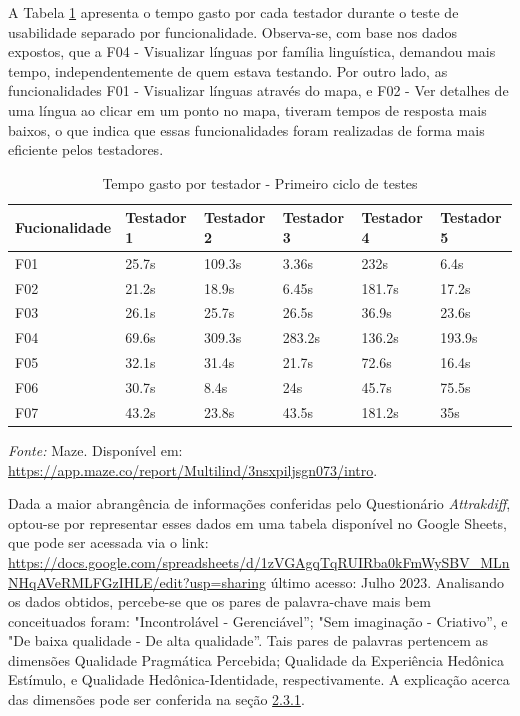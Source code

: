 A Tabela \ref{tab06} apresenta o tempo gasto por cada testador durante o teste de usabilidade separado por funcionalidade. Observa-se, com base nos dados expostos, que a F04 - Visualizar línguas por família linguística, 
demandou mais tempo, independentemente de quem estava testando. Por outro lado, as funcionalidades F01 - Visualizar línguas através do mapa, e F02 - Ver detalhes de uma língua ao clicar em um ponto no mapa, tiveram tempos 
de resposta mais baixos, o que indica que essas funcionalidades foram realizadas de forma mais eficiente pelos testadores.

\begin{table}[h!]
	\centering
	\caption{Tempo gasto por testador - Primeiro ciclo de testes}
	\label{tab06}
	\begin{adjustbox}{center}
	\begin{tabular}{l|l|l|l|l|l}
	\hline
	Fucionalidade & Testador 1 & Testador 2 & Testador 3 & Testador 4 & Testador 5 \\ 	\hline
	F01                   & 25.7s     & 109.3s     & 3.36s      & 232s       & 6.4s      \\
	F02                   & 21.2s        & 18.9s      & 6.45s      & 181.7s    & 17.2s     \\
	F03                   & 26.1s        & 25.7s      & 26.5s      & 36.9s     & 23.6s     \\
	F04                   & 69.6s        & 309.3s     & 283.2s     & 136.2s     & 193.9s     \\
	F05                   & 32.1s      & 31.4s      & 21.7s     & 72.6s     & 16.4s     \\
	F06                   & 30.7s     & 8.4s      & 24s     & 45.7s     & 75.5s     \\
	F07                   & 43.2s     & 23.8s      & 43.5s     & 181.2s    & 35s      \\ 	\hline
	\end{tabular}
	\end{adjustbox}
	\begin{tablenotes}[flushleft]
		\centering
		\item \textit{Fonte:} Maze. Disponível em: \url{https://app.maze.co/report/Multilind/3nsxpiljsgn073/intro}.
	  \end{tablenotes}
\end{table}


Dada a maior abrangência de informações conferidas pelo Questionário \textit{Attrakdiff}, optou-se por representar esses dados em uma tabela disponível no Google Sheets, que pode ser acessada via o link: 
\url{https://docs.google.com/spreadsheets/d/1zVGAgqTqRUIRba0kFmWySBV_MLnNHqAVeRMLFGzIHLE/edit?usp=sharing} último acesso: Julho 2023. Analisando os dados obtidos, percebe-se que os pares de palavra-chave 
mais bem conceituados foram: "Incontrolável - Gerenciável''; "Sem imaginação - Criativo'', e "De baixa qualidade - De alta qualidade''. Tais pares de palavras pertencem as dimensões Qualidade Pragmática Percebida;
Qualidade da Experiência Hedônica Estímulo, e Qualidade Hedônica-Identidade, respectivamente. A explicação acerca das dimensões pode ser conferida na seção \hyperref[sec:Medicao2]{2.3.1}. 


